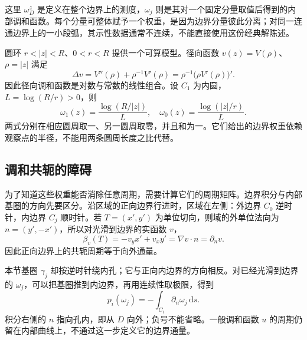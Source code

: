这里 \(\omega_D^z\) 是定义在整个边界上的测度，\(\omega_j\) 则是其对一个固定分量取值后得到的内部调和函数。每个分量可整体赋予一个权重，是因为边界分量彼此分离；对同一连通边界上的一小段弧，其示性数据通常不连续，不能直接使用这份经典解陈述。

\ProseParagraphBreak
圆环 \(r<|z|<R\)、\(0<r<R\) 提供一个可算模型。径向函数
\(v(z)=V(\rho)\)、\(\rho=|z|\) 满足
\[
 \Delta v=V''(\rho)+\rho^{-1}V'(\rho)
 =\rho^{-1}\bigl(\rho V'(\rho)\bigr)'.
\]
因此径向调和函数是对数与常数的线性组合。设 \(C_1\) 为内圆，
\(L=\log(R/r)>0\)，则
\[
 \omega_1(z)=\frac{\log(R/|z|)}{L},\quad
 \omega_0(z)=\frac{\log(|z|/r)}{L}.
\]
两式分别在相应圆周取一、另一圆周取零，并且和为一。它们给出的边界权重依赖观察点的半径，不能用两条圆周长度之比代替。

\subsection{调和共轭的障碍}
\label{b3:subsec:170503}

为了知道这些权重能否消除任意周期，需要计算它们的周期矩阵。边界积分与内部基圈的方向先要区分。沿区域的正向边界行进时，区域在左侧：外边界
\(C_0\) 逆时针，内边界 \(C_j\) 顺时针。若 \(T=(x',y')\) 为单位切向，则域的外单位法向为 \(n=(y',-x')\)，所以对光滑到边界的实函数 \(v\)，
\[
 \beta_v(T)=-v_yx'+v_xy'=\nabla v\cdot n=\partial_nv.
\]
因此正向边界上的共轭周期等于向外通量。

\ProseParagraphBreak
本节基圈 \(\gamma_j\) 却按逆时针绕内孔；它与正向内边界的方向相反。对已经光滑到边界的 \(\omega_j\)，可以把基圈推到内边界，再用连续性取极限，得到
\[
 p_i(\omega_j)=-\int_{C_i}\partial_n\omega_j\,\mathrm ds.
\]
积分右侧的 \(n\) 指向孔内，即从 \(D\) 向外；负号不能省略。一般调和函数
\(u\) 的周期仍留在内部曲线上，不通过这一步定义它的边界通量。


